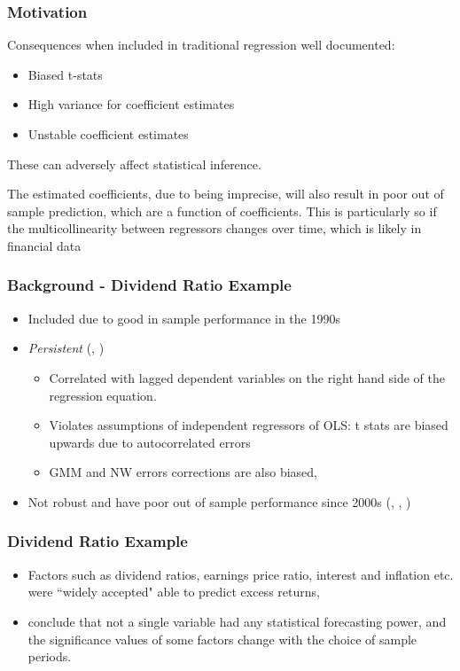\documentclass[aspectratio=169]{beamer}
\begin{document}
\begin{frame}
\frametitle{Motivation}
Consequences when included in traditional regression well documented:
\begin{itemize}
	\item Biased t-stats
	\item High variance for coefficient estimates
	\item Unstable coefficient estimates
\end{itemize}
These can adversely affect statistical inference. 

The estimated coefficients, due to being imprecise, will also result in poor out of sample prediction, which are a function of coefficients. This is particularly so if the multicollinearity between regressors changes over time, which is likely in financial data
\end{frame}

\begin{frame}
\frametitle{Background - Dividend Ratio Example}
\begin{itemize}

\item Included due to good in sample performance in the 1990s \citep{goyal_predicting_2003}

\item \textit{Persistent} (\cite{goetzmann_testing_1993}, \cite{ang_stock_2006})

	\begin{itemize}
	\item Correlated with lagged dependent variables on the right hand side of the regression equation. 
	
	\item Violates assumptions of independent regressors of OLS: t stats are biased upwards due to autocorrelated errors
	
	\item GMM and NW errors corrections are also biased, \citep{goetzmann_testing_1993}
	\end{itemize}

\item Not robust and have poor out of sample performance since 2000s (\cite{goyal_predicting_2003}, \cite{lettau_consumption_2001}, \cite{schwert_anomalies_2003})
\end{itemize}
\end{frame}

\begin{frame}
\frametitle{Dividend Ratio Example}
\begin{itemize}
\item Factors such as dividend ratios, earnings price ratio, interest and inflation etc. were ``widely accepted" able to predict excess returns, \citep{lettau_consumption_2001}

\item \cite{welch_comprehensive_2008} conclude that not a single variable had any statistical forecasting power, and the significance values of some factors change with the choice of sample periods.
\end{itemize}
\end{frame}
\end{document}
